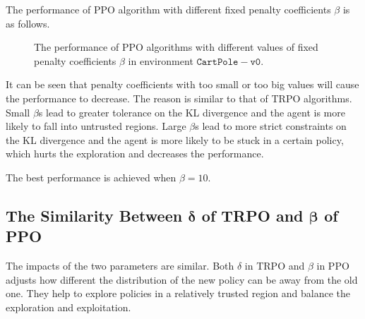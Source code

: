 \documentclass{article}
\newcommand{\bd}[1]{\boldsymbol{#1}}
\begin{document}
\hspace{1.8em}
The performance of PPO algorithm with different fixed penalty coefficients $\beta$ is as follows.

\begin{figure}[htbp]
    \centering
    \subfigure[random seed=14985]{
        \texttt{[image: seed=14985/PPO\_vary\_beta.pdf]}
    }
    \subfigure[random seed=20210530]{
        \texttt{[image: seed=20210530/PPO\_vary\_beta.pdf]}
    }

    \caption{The performance of PPO algorithms with different values of fixed penalty coefficients $\beta$ in environment $\mathtt{CartPole-v0}$.}
\end{figure}

It can be seen that penalty coefficients with too small or too big values will cause the performance to decrease. The reason is similar to that of TRPO algorithms. Small $\beta$s lead to greater tolerance on the KL divergence and the agent is more likely to fall into untrusted regions. Large $\beta$s lead to more strict constraints on the KL divergence and the agent is more likely to be stuck in a certain policy, which hurts the exploration and decreases the performance.

The best performance is achieved when $\beta=10$.

\vspace{1em}
\subsection{The Similarity Between $\bd{\delta}$ of TRPO and $\bd{\beta}$ of PPO}
\vspace{1em}

\hspace{1.8em}
The impacts of the two parameters are similar. Both $\delta$ in TRPO and $\beta$ in PPO adjusts how different the distribution of the new policy can be away from the old one. They help to explore policies in a relatively trusted region and balance the exploration and exploitation.
\end{document}
